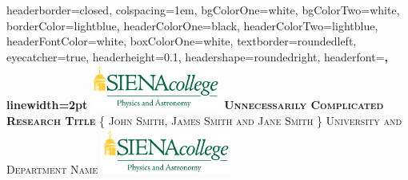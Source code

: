 \documentclass[landscape,a0paper,fontscale=0.285]{baposter} %
\begin{document}
\begin{poster}
{
    headerborder=closed, %
        colspacing=1em, %
        bgColorOne=white, %
        bgColorTwo=white, %
        borderColor=lightblue, %
        headerColorOne=black, %
        headerColorTwo=lightblue, %
        headerFontColor=white, %
        boxColorOne=white, %
        textborder=roundedleft, %
        eyecatcher=true, %
        headerheight=0.1\textheight, %
        headershape=roundedright, %
        headerfont=\Large\bf\textsc, %
        linewidth=2pt %
}
%
{\includegraphics[height=4em]{logo.jpg}} %
{\bf\textsc{Unnecessarily Complicated Research Title}\vspace{0.5em}} %
{\textsc{\{ John Smith, James Smith and Jane Smith \} \hspace{12pt} University and Department Name}} %
{\includegraphics[height=4em]{logo.jpg}} %


\end{poster}
\end{document}
